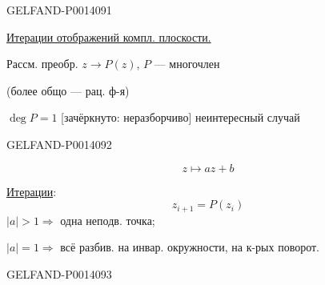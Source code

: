 \begin{GelfandAdjacentEvidence}{GELFAND-P001409}{1}

\qquad \uline{Итерации отображений компл. плоскости.}

Рассм. преобр. \(z\to P(z)\), \(P\) — многочлен

(более общо — рац. ф-я)

\(\deg P=1\) [зачёркнуто: неразборчиво] неинтересный случай
\end{GelfandAdjacentEvidence}
\begin{GelfandAdjacentEvidence}{GELFAND-P001409}{2}


\begin{equation*}
z\mapsto az+b \tag{1}
\end{equation*}

\uline{Итерации}:
\[
z_{i+1}=P(z_i)
\]
\(\lvert a\rvert>1\Rightarrow\) одна неподв. точка;

\(\lvert a\rvert=1\Rightarrow\) всё разбив. на инвар. окружности, на к-рых поворот.
\end{GelfandAdjacentEvidence}
\begin{GelfandAdjacentEvidence}{GELFAND-P001409}{3}


\end{GelfandAdjacentEvidence}
